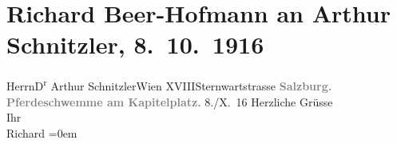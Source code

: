 

         
         \renewcommand{\erwaehntePersonen}{Personen: Richard Beer-Hofmann}
         \renewcommand{\erwaehnteOrte}{Orte: Kapitelplatz, Kapitelschwemme, Salzburg, Sternwartestraße, Wien, XVIII., Währing}
         \renewcommand{\erwaehnteWerke}{}
               \section[Richard Beer-Hofmann an Arthur Schnitzler, 8. 10. 1916]{ Richard Beer-Hofmann an Arthur Schnitzler, 8. 10. 1916}\nopagebreak{}\rehead{ }\begin{ledgroupsized}[t]{13cm}\normalsize\beginnumbering{} \toendnotes[C]{\smallbreak\pagebreak[2]} 
\pstart{}{\pb}Herrn\pend{}\pstart{}D\textsuperscript{r} Arthur Schnitzler\pend{}\pstart{}Wien XVIII\pend{}\pstart{}Sternwartstrasse\pend{}{\bigskip}\pstart
           \noindent{}\centering{}{\pb}\textcolor{gray}{\textbf{Salzburg.}}{\\}\textcolor{gray}{\textbf{Pferdeschwemme am Kapitelplatz.}}\pend
           \pstart
           \raggedleft{}{\pb}8./X. 16\pend
           \pstart
           Herzliche Grüsse{\\[\baselineskip]}Ihr{\\[\baselineskip]}\spacefill\mbox{Richard}\pend
           \leftskip=0em{}
         
         \endnumbering{}\end{ledgroupsized}  \newcommand{\dateiname}{L02242}\newcommand{\titel}{Richard Beer-Hofmann an Arthur Schnitzler, 8. 10. 1916}\newcommand{\editorInnen}{Martin Anton Müller und Gerd-Hermann Susen}
      